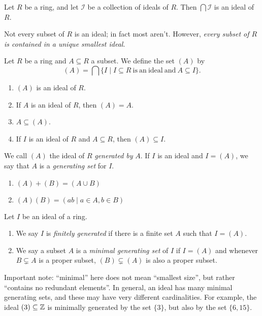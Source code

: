 \begin{prop}
Let \(R\) be a ring, and let \(\mathcal{I}\) be a collection of ideals of \(R\). Then \(\bigcap \mathcal{I}\) is an ideal of \(R\).
\end{prop}

Not every subset of \(R\) is an ideal; in fact most aren't. However, \emph{every subset of \(R\) is contained in a unique smallest ideal}.

\begin{prop}
Let \(R\) be a ring and \(A \subseteq R\) a subset. We define the set \((A)\) by \[ (A) = \bigcap \{ I \mid I \subseteq R\ \mathrm{is\ an\ ideal\ and}\ A \subseteq I \}. \]
\begin{enumerate}
\item \((A)\) is an ideal of \(R\).
\item If \(A\) is an ideal of \(R\), then \((A) = A\).
\item \(A \subseteq (A)\).
\item If \(I\) is an ideal of \(R\) and \(A \subseteq R\), then \((A) \subseteq I\).
\end{enumerate}
We call \((A)\) the ideal of \(R\) \emph{generated by} \(A\). If \(I\) is an ideal and \(I = (A)\), we say that \(A\) is a \emph{generating set} for \(I\).
\end{prop}

\begin{prop} \mbox{}
\begin{enumerate}
\item \((A) + (B) = (A \cup B)\)
\item \((A)(B) = (ab \mid a \in A, b \in B)\)
\end{enumerate}
\end{prop}

\begin{dfn}
Let \(I\) be an ideal of a ring.
\begin{enumerate}
\item We say \(I\) is \emph{finitely generated} if there is a finite set \(A\) such that \(I = (A)\).
\item We say a subset \(A\) is a \emph{minimal generating set} of \(I\) if \(I = (A)\) and whenever \(B \subsetneq A\) is a proper subset, \((B) \subsetneq (A)\) is also a proper subset.
\end{enumerate}
\end{dfn}

Important note: ``minimal'' here does not mean ``smallest size'', but rather ``contains no redundant elements''. In general, an ideal has many minimal generating sets, and these may have very different cardinalities. For example, the ideal \((3) \subseteq \mathbb{Z}\) is minimally generated by the set \(\{3\}\), but also by the set \(\{6,15\}\).

